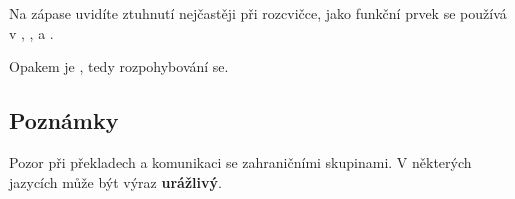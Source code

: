 Na zápase uvidíte ztuhnutí nejčastěji při rozcvičce, jako funkční prvek se používá  v , ,  a  . 
 
Opakem  je , tedy rozpohybování se.  
 
 
 
\subsection{ Poznámky }  
Pozor při překladech a komunikaci se zahraničními skupinami. V některých jazycích může být výraz  \textbf{urážlivý}. 
 
 
